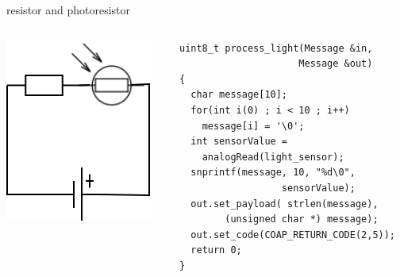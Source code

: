 \begin{frame}[containsverbatim]{resistor and photoresistor}
	\begin{columns}[c,onlytextwidth]
		\begin{column}[c]{.5\textwidth}
			\begin{center}
				\includegraphics [width=.9\textwidth,keepaspectratio]{img/resistor_photoresistor.png}
			\end{center}
		\end{column}
		\begin{column}[c]{.5\textwidth}
\begin{Verbatim}[fontsize=\scriptsize]
uint8_t process_light(Message &in, 
                     Message &out) 
{
  char message[10];
  for(int i(0) ; i < 10 ; i++)
    message[i] = '\0';
  int sensorValue = 
    analogRead(light_sensor);
  snprintf(message, 10, "%d\0", 
                  sensorValue);
  out.set_payload( strlen(message), 
        (unsigned char *) message);
  out.set_code(COAP_RETURN_CODE(2,5));
  return 0;
}
\end{Verbatim}
		\end{column}
	\end{columns}
\end{frame}

